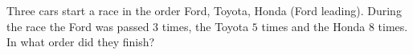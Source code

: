 Three cars start a race in the order Ford, Toyota, Honda (Ford leading). During the race the Ford was passed $3$ times, the Toyota $5$ times and the Honda $8$ times. In what order did they finish?

